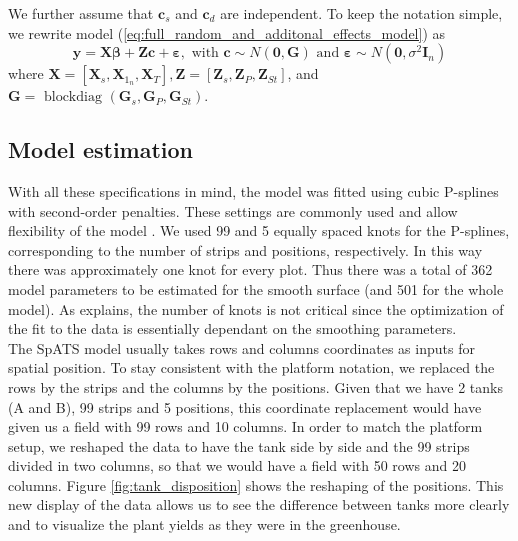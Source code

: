 We further assume that $\boldsymbol{c}_s$ and $\boldsymbol{c}_d$ are independent.
To keep the notation simple, we rewrite model (\ref{eq:full_random_and_additonal_effects_model}) as
\begin{equation}
    \boldsymbol{y}=
    \boldsymbol{X} \boldsymbol{\beta}+
    \boldsymbol{Z} \boldsymbol{c}+
    \boldsymbol{\varepsilon}, 
    \text { with } 
    \boldsymbol{c} \sim N(\mathbf{0}, \boldsymbol{G}) 
    \text { and } 
    \boldsymbol{\varepsilon} \sim N\left(\mathbf{0}, \sigma^{2} \boldsymbol{I}_{n}\right)
\end{equation}
where $\boldsymbol{X}=
\left[
	\boldsymbol{X}_{s}, \boldsymbol{X}_{1_{n}}, \mathbf{X}_{T} 
\right], 
\boldsymbol{Z}=
\left[
	\boldsymbol{Z}_{s}, \boldsymbol{Z}_{P}, \mathbf{Z}_{St}
\right]$, and $\boldsymbol{G}=\text { blockdiag }\left(\boldsymbol{G}_{s}, \boldsymbol{G}_{P}, \boldsymbol{G}_{St} \right)$.

\subsection{Model estimation}
With all these specifications in mind, the model was fitted using cubic P-splines with second-order penalties. These settings are commonly used and allow flexibility of the model \parencite{rodriguez-alvarez_correcting_2018,rodriguez-alvarez_spatial_2016,rodriguez-alvarez_fast_2015}. We used 99 and 5 equally spaced knots for the P-splines, corresponding to the number of strips and positions, respectively. In this way there was approximately one knot for every plot. Thus there was a total of 362 model parameters to be estimated for the smooth surface (and 501 for the whole model). As \textcite{rodriguez-alvarez_correcting_2018} explains, the number of knots is not critical since the optimization of the fit to the data is essentially dependant on the smoothing parameters.\\

The SpATS model usually takes rows and columns coordinates as inputs for spatial position. To stay consistent with the platform notation, we replaced the rows by the strips and the columns by the positions. Given that we have 2 tanks (A and B), 99 strips and 5 positions, this coordinate replacement would have given us a field with 99 rows and 10 columns. In order to match the platform setup, we reshaped the data to have the tank side by side and the 99 strips divided in two columns, so that we would have a field with 50 rows and 20 columns. Figure \ref{fig:tank_disposition} shows the reshaping of the positions. This new display of the data allows us to see the difference between tanks more clearly and to visualize the plant yields as they were in the greenhouse.\\


